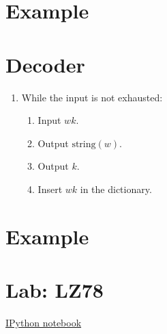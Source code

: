 \section*{Example}
\section{Decoder}

\begin{enumerate}
\tightlist
\item
  While the input is not exhausted:
  \begin{enumerate}
  \tightlist
  \item
    Input \(wk\).
  \item
    Output \(\text{string}(w)\).
  \item
    Output \(k\).
  \item
    Insert \(wk\) in the dictionary.
  \end{enumerate}
\end{enumerate}

\section*{Example}

\section{Lab: LZ78}
\href{https://nbviewer.jupyter.org/github/vicente-gonzalez-ruiz/LZ78/blob/master/LZ78.ipynb}{IPython notebook}


